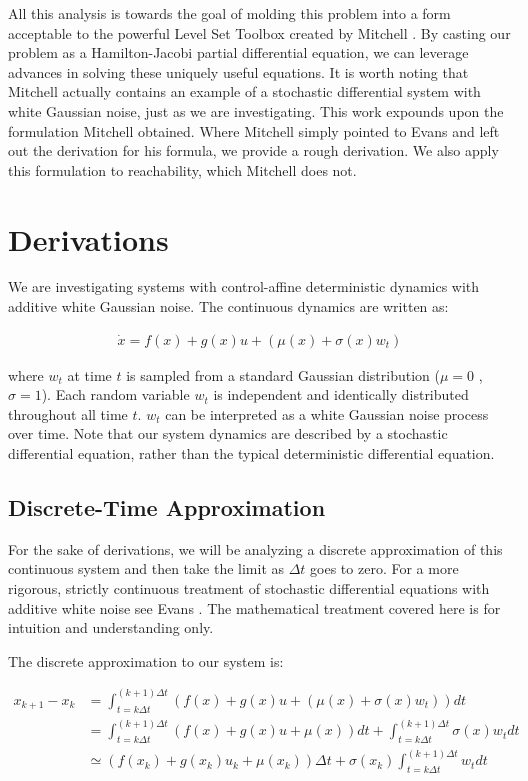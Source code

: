 \documentclass[a4paper]{article}
\begin{document}
All this analysis is towards the goal of molding this problem into a form acceptable to the powerful Level Set Toolbox created by Mitchell \cite{MitchellToolbox}.
By casting our problem as a Hamilton-Jacobi partial differential equation, we can leverage advances in solving these uniquely useful equations.
It is worth noting that Mitchell \cite{MitchellToolbox} actually contains an example of a stochastic differential system with white Gaussian noise, just as we are investigating.
This work expounds upon the formulation Mitchell obtained.
Where Mitchell simply pointed to Evans \cite{EvansSDE} and left out the derivation for his formula, we provide a rough derivation.
We also apply this formulation to reachability, which Mitchell does not.

\section{Derivations}
We are investigating systems with control-affine deterministic dynamics with additive white Gaussian noise.
The continuous dynamics are written as:

\begin{align}
\dot{x} = f(x) + g(x) u + (\mu(x) + \sigma(x) w_t)
\end{align}

where $w_t$ at time $t$ is sampled from a standard Gaussian distribution ($\mu = 0$ , $\sigma = 1$).
Each random variable $w_t$ is independent and identically distributed throughout all time $t$.
$w_t$ can be interpreted as a white Gaussian noise process over time.
Note that our system dynamics are described by a stochastic differential equation, rather than the typical deterministic differential equation.

\subsection{Discrete-Time Approximation}
For the sake of derivations, we will be analyzing a discrete approximation of this continuous system and then take the limit as $\Delta t$ goes to zero.
For a more rigorous, strictly continuous treatment of stochastic differential equations with additive white noise see Evans \cite{EvansSDE}.
The mathematical treatment covered here is for intuition and understanding only.

The discrete approximation to our system is:

\begin{align}
x_{k+1} - x_k &= \int_{t = k \Delta t}^{(k+1) \Delta t} (f(x) + g(x) u + (\mu(x) + \sigma(x) w_t) )dt
  \\  &= \int_{t = k \Delta t}^{(k+1) \Delta t} (f(x) + g(x) u + \mu(x)) dt + \int_{t = k \Delta t}^{(k+1) \Delta t} \sigma(x) w_t dt
\\ &\simeq (f(x_k) + g(x_k) u_k + \mu(x_k)) \Delta t + \sigma(x_k) \int_{t = k \Delta t}^{(k+1) \Delta t} w_t dt
\end{align}
\end{document}
